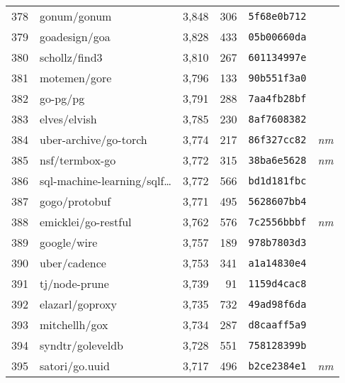 {\begin{supertabular}{llrrll}
        378 &                        gonum/gonum &  3,848 &    306 &  \texttt{5f68e0b712} &              \\
        379 &                      goadesign/goa &  3,828 &    433 &  \texttt{05b00660da} &              \\
        380 &                      schollz/find3 &  3,810 &    267 &  \texttt{601134997e} &              \\
        381 &                       motemen/gore &  3,796 &    133 &  \texttt{90b551f3a0} &              \\
        382 &                           go-pg/pg &  3,791 &    288 &  \texttt{7aa4fb28bf} &              \\
        383 &                       elves/elvish &  3,785 &    230 &  \texttt{8af7608382} &              \\
        384 &              uber-archive/go-torch &  3,774 &    217 &  \texttt{86f327cc82} &  \textit{nm} \\
        385 &                     nsf/termbox-go &  3,772 &    315 &  \texttt{38ba6e5628} &  \textit{nm} \\
        386 &    sql-machine-learning/sqlf\ldots &  3,772 &    566 &  \texttt{bd1d181fbc} &              \\
        387 &                      gogo/protobuf &  3,771 &    495 &  \texttt{5628607bb4} &              \\
        388 &                emicklei/go-restful &  3,762 &    576 &  \texttt{7c2556bbbf} &  \textit{nm} \\
        389 &                        google/wire &  3,757 &    189 &  \texttt{978b7803d3} &              \\
        390 &                       uber/cadence &  3,753 &    341 &  \texttt{a1a14830e4} &              \\
        391 &                      tj/node-prune &  3,739 &     91 &  \texttt{1159d4cac8} &              \\
        392 &                    elazarl/goproxy &  3,735 &    732 &  \texttt{49ad98f6da} &              \\
        393 &                      mitchellh/gox &  3,734 &    287 &  \texttt{d8caaff5a9} &              \\
        394 &                   syndtr/goleveldb &  3,728 &    551 &  \texttt{758128399b} &              \\
        395 &                     satori/go.uuid &  3,717 &    496 &  \texttt{b2ce2384e1} &  \textit{nm} \\

\end{supertabular}}
